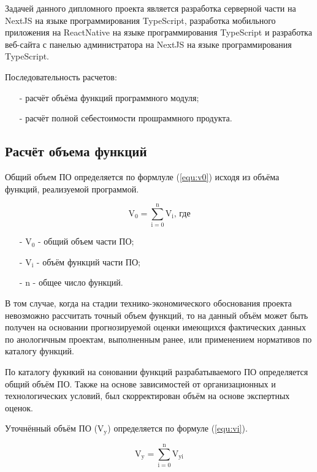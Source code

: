Задачей данного дипломного проекта является
разработка серверной части на NextJS на языке программирования TypeScript,
разработка мобильного приложения на ReactNative на языке программирования TypeScript
и разработка веб-сайта с панелью администратора на NextJS на языке программирования TypeScript.

Последовательность расчетов:

\begin{enumerate}
    \item[-] расчёт объёма функций программного модуля;
    \item[-] расчёт полной себестоимости прошраммного продукта.
\end{enumerate}

\subsection{Расчёт объема функций}

Общий объем ПО определяется по формлуле (\ref{equ:v0}) исходя из объёма функций, реализуемой программой.

\begin{equation}
    \label{equ:v0}
    \text{V}_0 = \sum^\text{n}_{\text{i}=0} \text{V}_\text{i} \text{, где}
\end{equation}

\begin{enumerate}
    \item[-] $\text{V}_0$ - общий объем части ПО; 
    \item[-] $\text{V}_\text{i}$ - объём функций части ПО;  
    \item[-] $\text{n}$ - общее число функций.
\end{enumerate}

В том случае, когда на стадии технико-экономического обоснования проекта невозможно рассчитать точный объем функций,
то на данный объём может быть получен на основании прогнозируемой оценки имеющихся фактических данных по анологичным проектам, выполненным ранее,
или применением нормативов по каталогу функций.

По каталогу фукнкий на соновании функций разрабатываемого ПО определяется общий объём ПО.
Также на основе зависимостей от организационных и технологических условий,
был скорректирован объём на основе экспертных оценок.

Уточнённый объём ПО ($\text{V}_\text{y}$) определяется по формуле (\ref{equ:vi}).

\begin{equation}
    \label{equ:vi}
    \text{V}_\text{y} = \sum^\text{n}_{\text{i}=0} \text{V}_\text{yi}
\end{equation}

